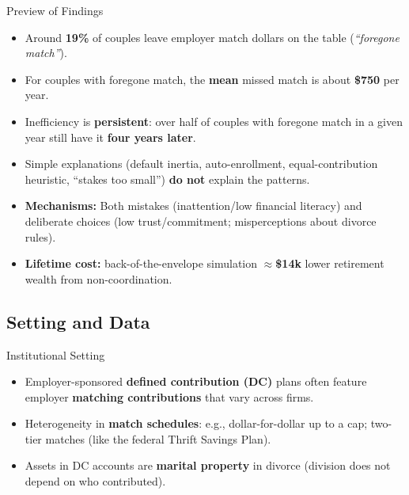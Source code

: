 \documentclass[11pt,notes=hide,aspectratio=169,mathserif]{beamer}
\begin{document}
\begin{frame}{Preview of Findings}
\small
\begin{itemize}
  \item Around \textbf{19\%} of couples leave employer match dollars on the table (\emph{``foregone match''}).
  \item For couples with foregone match, the \textbf{mean} missed match is about \textbf{\$750} per year.
  \item Inefficiency is \textbf{persistent}: over half of couples with foregone match in a given year still have it \textbf{four years later}.
  \item Simple explanations (default inertia, auto-enrollment, equal-contribution heuristic, ``stakes too small'') \textbf{do not} explain the patterns.
  \item \textbf{Mechanisms:} Both mistakes (inattention/low financial literacy) and deliberate choices (low trust/commitment; misperceptions about divorce rules).
  \item \textbf{Lifetime cost:} back-of-the-envelope simulation $\approx$\textbf{\$14k} lower retirement wealth from non-coordination.
\end{itemize}
\end{frame}

\subsection{Setting and Data}

\begin{frame}{Institutional Setting}
\small
\begin{itemize}
  \item Employer-sponsored \textbf{defined contribution (DC)} plans often feature employer \textbf{matching contributions} that vary across firms.
  \item Heterogeneity in \textbf{match schedules}: e.g., dollar-for-dollar up to a cap; two-tier matches (like the federal Thrift Savings Plan).
  \item Assets in DC accounts are \textbf{marital property} in divorce (division does not depend on who contributed).
\end{itemize}
\end{frame}
\end{document}
